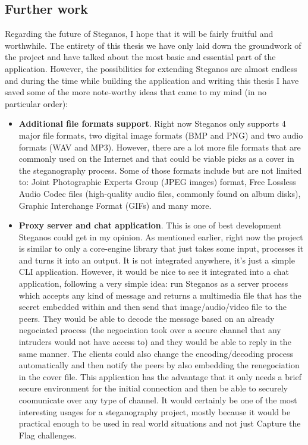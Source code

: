 \begin{multicols}{2}
\section{Further work}
Regarding the future of Steganos, I hope that it will be fairly fruitful and worthwhile. The entirety of this thesis we have only laid down the groundwork of the project and have talked about the most basic and essential part of the application. However, the possibilities for extending Steganos are almost endless and during the time while building the application and writing this thesis I have saved some of the more note-worthy ideas that came to my mind (in no particular order):
\begin{itemize}
	\item \textbf{Additional file formats support}. Right now Steganos only supports 4 major file formats, two digital image formats (BMP and PNG) and two audio formats (WAV and MP3). However, there are a lot more file formats that are commonly used on the Internet and that could be viable picks as a cover in the steganography process. Some of those formats include but are not limited to: Joint Photographic Experts Group (JPEG images) format, Free Lossless Audio Codec files (high-quality audio files, commonly found on album disks), Graphic Interchange Format (GIFs) and many more. 
	\item \textbf{Proxy server and chat application}. This is one of best development Steganos could get in my opinion. As mentioned earlier, right now the project is similar to only a core-engine library that just takes some input, processes it and turns it into an output. It is not integrated anywhere, it's just a simple CLI application. However, it would be nice to see it integrated into a chat application, following a very simple idea: run Steganos as a server process which accepts any kind of message and returns a multimedia file that has the secret embedded within and then send that image/audio/video file to the peers. They would be able to decode the message based on an already negociated process (the negociation took over a secure channel that any intruders would not have access to) and they would be able to reply in the same manner. The clients could also change the encoding/decoding process automatically and then notify the peers by also embedding the renegociation in the cover file. This application has the advantage that it only needs a brief secure environment for the initial connection and then be able to securely coomunicate over any type of channel. It would certainly be one of the most interesting usages for a steganography project, mostly because it would be practical enough to be used in real world situations and not just Capture the Flag challenges.

\end{itemize}
\end{multicols}
